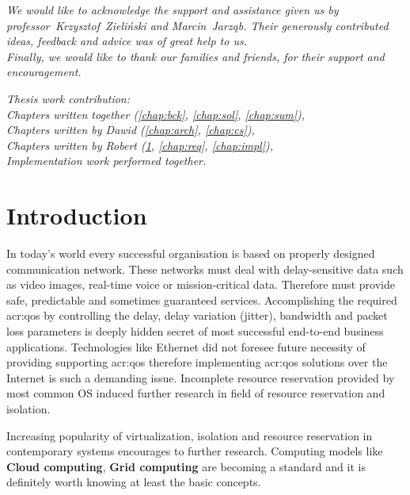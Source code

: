\documentclass[11pt]{book}
\begin{document}
	\begin{center}
    \textit{We would like to acknowledge the support and assistance given us by professor~Krzysztof~Zieliński and
            Marcin~Jarząb. Their generously contributed ideas, feedback and advice was of great help to us. \\
            Finally, we would like to thank our families and friends, for their support and encouragement.}
  \end{center}

  \newpage
	\vspace*{2in}

	\begin{center}
   	\textit{Thesis work contribution: \\
            Chapters written together (\ref{chap:bck}, \ref{chap:sol}, \ref{chap:sum}), \\
            Chapters written by Dawid (\ref{chap:arch}, \ref{chap:cs}), \\
            Chapters written by Robert (\ref{chap:intro}, \ref{chap:req}, \ref{chap:impl}), \\
            Implementation work performed together.}
  	\end{center}


  \chapter{Introduction}
  \label{chap:intro}

    In today's world every successful organisation is based on properly designed communication network. These networks
    must deal with delay-sensitive data such as video images, real-time voice or mission-critical data. Therefore must
    provide safe, predictable and sometimes guaranteed services. Accomplishing the required \gls{acr:qos} by controlling
    the delay, delay variation (jitter), bandwidth and packet loss parameters is deeply hidden secret of most successful
    end-to-end business applications. Technologies like Ethernet did not foresee future necessity of providing
    supporting \gls{acr:qos} therefore implementing \gls{acr:qos} solutions over the Internet is such a demanding issue.
    Incomplete resource reservation provided by most common OS induced further research in field of resource reservation
    and isolation. 


    Increasing popularity of virtualization, isolation and resource reservation in contemporary systems encourages to
    further research. Computing models like \textbf{Cloud computing}, \textbf{Grid computing} are becoming a standard
    and it is definitely worth knowing at least the basic concepts.
\end{document}
